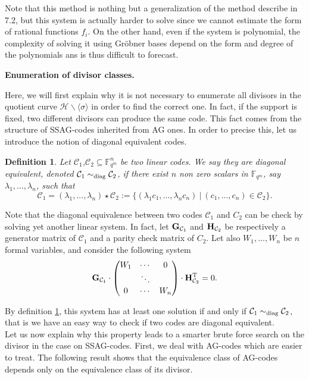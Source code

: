 \documentclass[10pt]{article}
\newtheorem{def1}{Definition}[]
\newcommand{\s}{\vspace{0.3cm}}
\newcommand{\cd}{\cdot}
\newcommand{\C}{\mathcal{C}}
\newcommand{\fqm}{\mathbb{F}_{q^m}}
\newcommand{\su}{\subseteq}
\begin{document}
Note that this method is nothing but a generalization of the method describe in 7.2, but this system is actually harder to solve since we cannot estimate the form of rational functions $f_i$. On the other hand, even if the system is polynomial, the complexity of solving it using Gröbner bases depend on the form and degree of the polynomials ans is thus difficult to forecast.

\newpage

\bf{Enumeration of divisor classes.} \rm

\s

Here, we will first explain why it is not necessary to enumerate all divisors in the quotient curve $\mathcal{H}\backslash \langle \sigma \rangle$ in order to find the correct one. In fact, if the support is fixed, two different divisors can produce the same code. This fact comes from the structure of SSAG-codes inherited from AG ones. In order to precise this, let us introduce the notion of diagonal equivalent codes.

\s

\begin{def1} \label{diag}
Let $\C_1$,$\C_2 \su \fqm^n$ be two linear codes. We say they are diagonal equivalent, denoted $\C_1 \sim_{\rm diag} \C_2$, if there exist $n$ non zero scalars in $\fqm$, say $\lambda_1,...,\lambda_n$, such that 
\[\C_1 = (\lambda_1,...,\lambda_n) \star \C_2 := \{(\lambda_1c_1,...,\lambda_nc_n) \ | \ (c_1,...,c_n) \in \C_2\}.\]
\end{def1} 

Note that the diagonal equivalence between two codes $\C_1$ and $C_2$ can be check by solving yet another linear system. In fact, let $\bf{G}_{\rm \C_1}$ and $\bf{H}_{\rm \C_2}$ be respectively a generator matrix of $\C_1$ and a parity check matrix of $C_2$. Let also $W_1,...,W_n$ be $n$ formal variables, and consider the following system
\begin{equation}
\bf{G}_{\rm \C_1} \cd \begin{pmatrix}
W_1 & \cdots & 0 \\
\null & \ddots & \null \\
0 & \cdots & W_n
\end{pmatrix} \cd \bf{H}_{\rm \C_2}^{\rm T}\rm = 0.
\end{equation}

By definition \ref{diag}, this system has at least one solution if and only if $\C_1 \sim_{\rm diag} \C_2$, that is we have an easy way to check if two codes are diagonal equivalent. \\
Let us now explain why this property leads to a smarter brute force search on the divisor in the case on SSAG-codes. First, we deal with AG-codes which are easier to treat. The following result shows that the equivalence class of AG-codes depends only on the equivalence class of its divisor.
\end{document}
